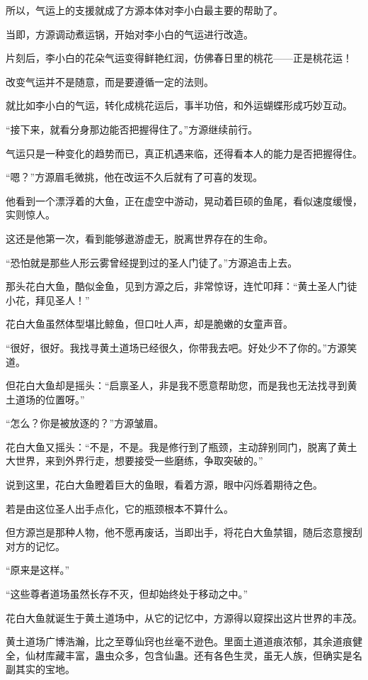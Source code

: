 \begin{this_body}
所以，气运上的支援就成了方源本体对李小白最主要的帮助了。

当即，方源调动煮运锅，开始对李小白的气运进行改造。

片刻后，李小白的花朵气运变得鲜艳红润，仿佛春日里的桃花——正是桃花运！

改变气运并不是随意，而是要遵循一定的法则。

就比如李小白的气运，转化成桃花运后，事半功倍，和外运蝴蝶形成巧妙互动。

“接下来，就看分身那边能否把握得住了。”方源继续前行。

气运只是一种变化的趋势而已，真正机遇来临，还得看本人的能力是否把握得住。

“嗯？”方源眉毛微挑，他在改运不久后就有了可喜的发现。

他看到一个漂浮着的大鱼，正在虚空中游动，晃动着巨硕的鱼尾，看似速度缓慢，实则惊人。

这还是他第一次，看到能够遨游虚无，脱离世界存在的生命。

“恐怕就是那些人形云雾曾经提到过的圣人门徒了。”方源追击上去。

那头花白大鱼，酷似金鱼，见到方源之后，非常惊讶，连忙叩拜：“黄土圣人门徒小花，拜见圣人！”

花白大鱼虽然体型堪比鲸鱼，但口吐人声，却是脆嫩的女童声音。

“很好，很好。我找寻黄土道场已经很久，你带我去吧。好处少不了你的。”方源笑道。

但花白大鱼却是摇头：“启禀圣人，非是我不愿意帮助您，而是我也无法找寻到黄土道场的位置呀。”

“怎么？你是被放逐的？”方源皱眉。

花白大鱼又摇头：“不是，不是。我是修行到了瓶颈，主动辞别同门，脱离了黄土大世界，来到外界行走，想要接受一些磨练，争取突破的。”

说到这里，花白大鱼瞪着巨大的鱼眼，看着方源，眼中闪烁着期待之色。

若是由这位圣人出手点化，它的瓶颈根本不算什么。

但方源岂是那种人物，他不愿再废话，当即出手，将花白大鱼禁锢，随后恣意搜刮对方的记忆。

“原来是这样。”

“这些尊者道场虽然长存不灭，但却始终处于移动之中。”

花白大鱼就诞生于黄土道场中，从它的记忆中，方源得以窥探出这片世界的丰茂。

黄土道场广博浩瀚，比之至尊仙窍也丝毫不逊色。里面土道道痕浓郁，其余道痕健全，仙材库藏丰富，蛊虫众多，包含仙蛊。还有各色生灵，虽无人族，但确实是名副其实的宝地。


\end{this_body}
